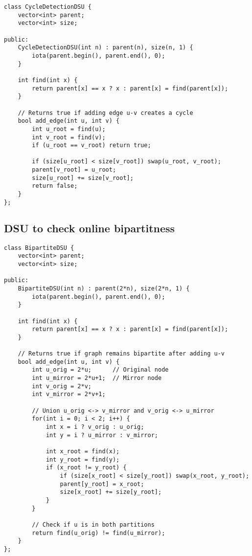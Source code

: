 \documentclass[10pt]{article}
\begin{document}
\begin{multicols*}{2}
\begin{lstlisting}[style=compactcpp]
class CycleDetectionDSU {
    vector<int> parent;
    vector<int> size;

public:
    CycleDetectionDSU(int n) : parent(n), size(n, 1) {
        iota(parent.begin(), parent.end(), 0);
    }

    int find(int x) {
        return parent[x] == x ? x : parent[x] = find(parent[x]);
    }

    // Returns true if adding edge u-v creates a cycle
    bool add_edge(int u, int v) {
        int u_root = find(u);
        int v_root = find(v);
        if (u_root == v_root) return true;
        
        if (size[u_root] < size[v_root]) swap(u_root, v_root);
        parent[v_root] = u_root;
        size[u_root] += size[v_root];
        return false;
    }
};
\end{lstlisting}

\subsection{DSU to check online bipartitness}

\begin{lstlisting}[style=compactcpp]
class BipartiteDSU {
    vector<int> parent;
    vector<int> size;

public:
    BipartiteDSU(int n) : parent(2*n), size(2*n, 1) {
        iota(parent.begin(), parent.end(), 0);
    }

    int find(int x) {
        return parent[x] == x ? x : parent[x] = find(parent[x]);
    }

    // Returns true if graph remains bipartite after adding u-v
    bool add_edge(int u, int v) {
        int u_orig = 2*u;      // Original node
        int u_mirror = 2*u+1;  // Mirror node
        int v_orig = 2*v;
        int v_mirror = 2*v+1;

        // Union u_orig <-> v_mirror and v_orig <-> u_mirror
        for(int i = 0; i < 2; i++) {
            int x = i ? v_orig : u_orig;
            int y = i ? u_mirror : v_mirror;
            
            int x_root = find(x);
            int y_root = find(y);
            if (x_root != y_root) {
                if (size[x_root] < size[y_root]) swap(x_root, y_root);
                parent[y_root] = x_root;
                size[x_root] += size[y_root];
            }
        }

        // Check if u is in both partitions
        return find(u_orig) != find(u_mirror);
    }
};



\end{lstlisting}
\end{multicols*}
\end{document}
